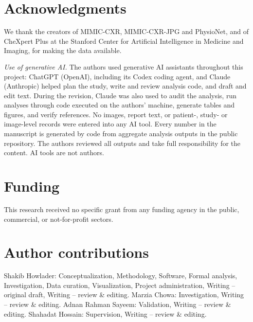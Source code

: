 \documentclass[12pt,a4paper]{article}
\begin{document}







\clearpage
\section*{Acknowledgments}
We thank the creators of MIMIC-CXR, MIMIC-CXR-JPG and PhysioNet, and of CheXpert
Plus at the Stanford Center for Artificial Intelligence in Medicine and Imaging,
for making the data available.\cite{johnson2019cxr,johnson2024cxrdata,johnson2019jpgpaper,johnson2024jpgdata,pollard2026,chambon2024}

\noindent\textit{Use of generative AI.} The authors used generative AI
assistants throughout this project: ChatGPT (OpenAI), including its Codex
coding agent, and Claude (Anthropic) helped plan the study, write and review analysis code, and draft
and edit text. During the revision, Claude was also used to audit the analysis,
run analyses through code executed on the authors' machine, generate tables and
figures, and verify references. No images, report text, or patient-, study- or
image-level records were entered into any AI tool. Every number in the
manuscript is generated by code from aggregate analysis outputs in the public
repository. The authors reviewed all outputs and take full responsibility for
the content. AI tools are not authors.

\section*{Funding}
This research received no specific grant from any funding agency in the public,
commercial, or not-for-profit sectors.

\section*{Author contributions}
Shakib Howlader: Conceptualization, Methodology, Software, Formal analysis,
Investigation, Data curation, Visualization, Project administration, Writing --
original draft, Writing -- review \& editing. Marzia Chowa: Investigation,
Writing -- review \& editing. Adnan Rahman Sayeem: Validation,
Writing -- review \& editing. Shahadat Hossain: Supervision, Writing -- review \&
editing.
\end{document}

